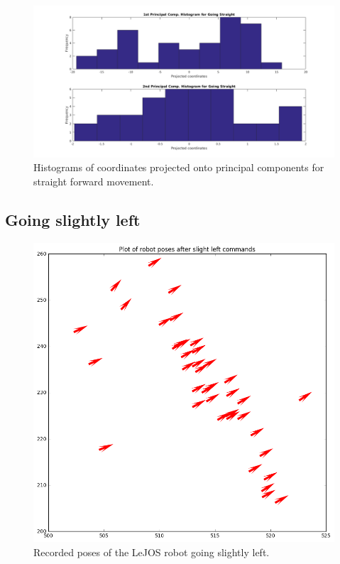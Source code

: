 \documentclass[paper=a4, fontsize=11pt]{scrartcl} %
\begin{document}
    \begin{figure}[h!]
        \begin{center}
            \setlength{\fboxsep}{0.5pt} %
            \setlength{\fboxrule}{0.5pt}
            \includegraphics[width=\linewidth,fbox]{images/pca_histogram_straight.png}
            \caption{Histograms of coordinates projected onto principal components for straight forward movement.}
        \end{center}
    \end{figure}
	
    \newpage
    \subsection{Going slightly left}
    \begin{figure}[h!]
        \begin{center}
            \setlength{\fboxsep}{0.5pt} %
            \setlength{\fboxrule}{0.5pt}
            \includegraphics[width=0.7\linewidth,fbox]{images/poses_plot_2_slightLeft.png}
            \caption{Recorded poses of the LeJOS robot going slightly left.}
        \end{center}
    \end{figure}
\end{document}
